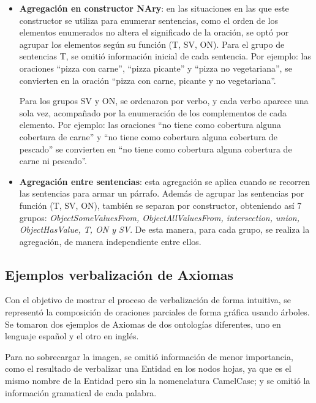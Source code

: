 \begin{itemize}
    \item {\bf Agregación en constructor NAry}: en las situaciones en las que este constructor se utiliza para enumerar sentencias, como el orden de los elementos enumerados no altera el significado de la oración, se optó por agrupar los elementos según su función (T, SV, ON). Para el grupo de sentencias T, se omitió información inicial de cada sentencia. Por ejemplo: las oraciones ``pizza con carne'', ``pizza picante'' y ``pizza no vegetariana'', se convierten en la oración ``pizza con carne, picante y no vegetariana''.
    
    Para los grupos SV y ON, se ordenaron por verbo, y cada verbo aparece una sola vez, acompañado por la enumeración de los complementos de cada elemento. Por ejemplo: las oraciones ``no tiene como cobertura alguna cobertura de carne'' y ``no tiene como cobertura alguna cobertura de pescado'' se convierten en ``no tiene como cobertura alguna cobertura de carne ni pescado''.
    
    \item {\bf Agregación entre sentencias}: esta agregación se aplica cuando se recorren las sentencias para armar un párrafo. Además de agrupar las sentencias por función (T, SV, ON), también se separan por constructor, obteniendo así 7 grupos: \emph{ObjectSomeValuesFrom, ObjectAllValuesFrom, intersection, union, ObjectHasValue, T, ON y SV}. De esta manera, para cada grupo, se realiza la agregación, de manera independiente entre ellos.
\end{itemize}

\subsection{Ejemplos verbalización de Axiomas}
Con el objetivo de mostrar el proceso de verbalización de forma intuitiva, se representó la composición de oraciones parciales de forma gráfica usando árboles. Se tomaron dos ejemplos de Axiomas de dos ontologías diferentes, uno en lenguaje español y el otro en inglés.

Para no sobrecargar la imagen, se omitió información de menor importancia, como el resultado de verbalizar una Entidad en los nodos hojas, ya que es el mismo nombre de la Entidad pero sin la nomenclatura CamelCase; y se omitió la información gramatical de cada palabra.


